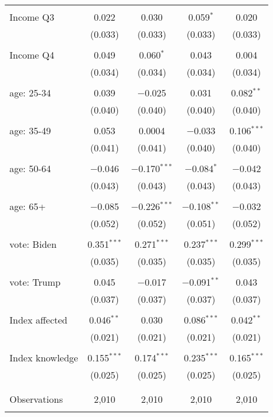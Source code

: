 \begin{tabular}{@{\extracolsep{5pt}}lcccc}
  & & & & \\ 
 Income Q3 & 0.022 & 0.030 & 0.059$^{*}$ & 0.020 \\ 
  & (0.033) & (0.033) & (0.033) & (0.033) \\ 
  & & & & \\ 
 Income Q4 & 0.049 & 0.060$^{*}$ & 0.043 & 0.004 \\ 
  & (0.034) & (0.034) & (0.034) & (0.034) \\ 
  & & & & \\ 
 age: 25-34 & 0.039 & $-$0.025 & 0.031 & 0.082$^{**}$ \\ 
  & (0.040) & (0.040) & (0.040) & (0.040) \\ 
  & & & & \\ 
 age: 35-49 & 0.053 & 0.0004 & $-$0.033 & 0.106$^{***}$ \\ 
  & (0.041) & (0.041) & (0.040) & (0.040) \\ 
  & & & & \\ 
 age: 50-64 & $-$0.046 & $-$0.170$^{***}$ & $-$0.084$^{*}$ & $-$0.042 \\ 
  & (0.043) & (0.043) & (0.043) & (0.043) \\ 
  & & & & \\ 
 age: 65+ & $-$0.085 & $-$0.226$^{***}$ & $-$0.108$^{**}$ & $-$0.032 \\ 
  & (0.052) & (0.052) & (0.051) & (0.052) \\ 
  & & & & \\ 
 vote: Biden & 0.351$^{***}$ & 0.271$^{***}$ & 0.237$^{***}$ & 0.299$^{***}$ \\ 
  & (0.035) & (0.035) & (0.035) & (0.035) \\ 
  & & & & \\ 
 vote: Trump & 0.045 & $-$0.017 & $-$0.091$^{**}$ & 0.043 \\ 
  & (0.037) & (0.037) & (0.037) & (0.037) \\ 
  & & & & \\ 
 Index affected & 0.046$^{**}$ & 0.030 & 0.086$^{***}$ & 0.042$^{**}$ \\ 
  & (0.021) & (0.021) & (0.021) & (0.021) \\ 
  & & & & \\ 
 Index knowledge & 0.155$^{***}$ & 0.174$^{***}$ & 0.235$^{***}$ & 0.165$^{***}$ \\ 
  & (0.025) & (0.025) & (0.025) & (0.025) \\ 
  & & & & \\ 
\hline \\[-1.8ex] 

Observations & 2,010 & 2,010 & 2,010 & 2,010 \\ 
\hline 
\hline \\[-1.8ex] 
\end{tabular} 